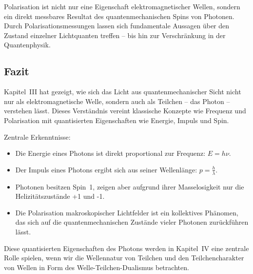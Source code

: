 \begin{tcolorbox}[physikbox, title=Was uns die Polarisation über Photonen verrät ]
	\label{box:Was uns die}
	Polarisation ist nicht nur eine Eigenschaft elektromagnetischer Wellen, sondern ein direkt messbares Resultat des quantenmechanischen Spins von Photonen. Durch Polarisationsmessungen lassen sich fundamentale Aussagen über den Zustand einzelner Lichtquanten treffen – bis hin zur Verschränkung in der Quantenphysik.
\end{tcolorbox}

\subsection{Fazit }

Kapitel~III hat gezeigt, wie sich das Licht aus quantenmechanischer Sicht nicht nur als elektromagnetische Welle, sondern auch als Teilchen -- das Photon -- verstehen lässt. Dieses Verständnis vereint klassische Konzepte wie Frequenz und Polarisation mit quantisierten Eigenschaften wie Energie, Impuls und Spin.

\vspace{0.5em}
Zentrale Erkenntnisse:
\begin{itemize}
	\item Die Energie eines Photons ist direkt proportional zur Frequenz: \( E = h\nu \).
	\item Der Impuls eines Photons ergibt sich aus seiner Wellenlänge: \( p = \frac{h}{\lambda} \).
	\item Photonen besitzen Spin~1, zeigen aber aufgrund ihrer Masselosigkeit nur die Helizitätszustände +1 und -1.
	\item Die Polarisation makroskopischer Lichtfelder ist ein kollektives Phänomen, das sich auf die quantenmechanischen Zustände vieler Photonen zurückführen lässt.
\end{itemize}

\vspace{0.5em}
Diese quantisierten Eigenschaften des Photons werden in Kapitel~IV eine zentrale Rolle spielen, wenn wir die Wellennatur von Teilchen und den Teilchencharakter von Wellen in Form des Welle-Teilchen-Dualismus betrachten.
